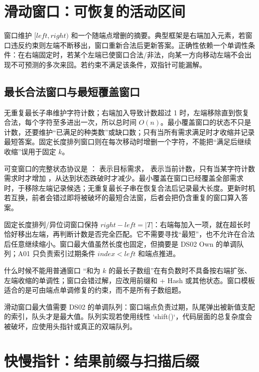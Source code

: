 \documentclass[UTF8,fontset=none,11pt,a4paper]{ctexart}
\begin{document}
\section{滑动窗口：可恢复的活动区间}

窗口维护 $[left,right)$ 和一个随端点增删的摘要。典型框架是右端加入元素，若窗口违反约束则左端不断移出，窗口重新合法后更新答案。正确性依赖一个单调性条件：在右端固定时，若某个左端已使窗口合法/非法，向某一方向移动左端不会出现不可预测的多次来回。若约束不满足该条件，双指针可能漏解。

\subsection{最长合法窗口与最短覆盖窗口}

无重复最长子串维护字符计数；右端加入导致计数超过 1 时，左端移除直到恢复合法，每个字符至多进出一次，所以总时间 $O(n)$。最小覆盖窗口的状态不只是计数，还要维护“已满足的种类数”或缺口数；只有当所有需求满足时才收缩并记录最短答案。固定长度排列窗口则在每次移动时增删一个字符，不能把“满足后继续收缩”误用于固定 $k$。

可变窗口的完整状态协议是 ： 表示目标需求， 表示当前计数，只有当某字符计数需求时才增加 ，从达到状态跌破时才减少。最小覆盖在窗口已经覆盖全部需求时，于移除左端记录候选；无重复最长子串在恢复合法后记录最大长度。更新时机若互换，前者会错过即将被破坏的最短合法窗，后者会把仍含重复的窗口算入答案。

固定长度排列/异位词窗口保持 $right-left=|T|$：右端每加入一项，就在超长时恰好移出左端，再判断计数是否完全匹配。它不需要寻找“最短”，也不允许在合法后任意继续缩小。窗口最大值虽然长度也固定，但摘要是 DS02 Own 的单调队列；A01 只负责索引过期条件 $index<left$ 和端点推进。

\begin{warnbox}{什么时候不能用普通窗口}
“和为 $k$ 的最长子数组”在有负数时不具备按右端扩张、左端收缩的单调性；窗口会错过解，应改用前缀和 + Hash 或其他状态。窗口模板适合的是可由端点单调修复的约束，而不是所有子数组题。
\end{warnbox}

滑动窗口最大值需要 DS02 的单调队列：窗口端点负责过期，队尾弹出被新值支配的索引，队头才是最大值。队列实现若使用线性 `shift()`，代码层面的总复杂度会被破坏，应使用头指针或真正的双端队列。

\section{快慢指针：结果前缀与扫描后缀}
\end{document}
